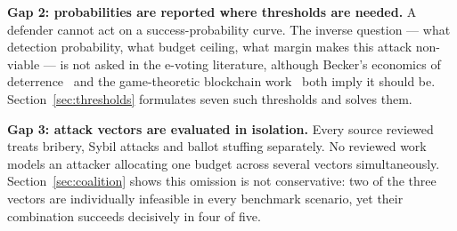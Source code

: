 \textbf{Gap 2: probabilities are reported where thresholds are
needed.} A defender cannot act on a success-probability curve. The
inverse question --- what detection probability, what budget ceiling,
what margin makes this attack non-viable --- is not asked in the
e-voting literature, although Becker's economics of
deterrence~\cite{becker1968} and the game-theoretic blockchain
work~\cite{eyal2014,liu2019} both imply it should be.
Section~\ref{sec:thresholds} formulates seven such thresholds and
solves them.

\textbf{Gap 3: attack vectors are evaluated in isolation.} Every source
reviewed treats bribery, Sybil attacks and ballot stuffing separately.
No reviewed work models an attacker allocating one budget across
several vectors simultaneously. Section~\ref{sec:coalition} shows this
omission is not conservative: two of the three vectors are individually
infeasible in every benchmark scenario, yet their combination succeeds
decisively in four of five.
